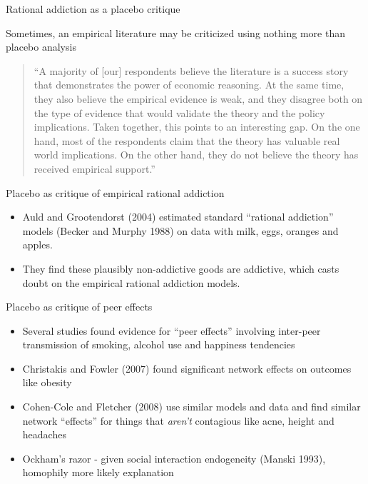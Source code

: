 \documentclass{beamer}
\begin{document}
\begin{frame}{Rational addiction as a placebo critique}


Sometimes, an empirical literature may be criticized using nothing more than placebo analysis

\begin{quote}``A majority of [our] respondents believe the literature is a success story that demonstrates the power of economic reasoning.  At the same time, they also believe the empirical evidence is weak, and they disagree both on the type of evidence that would validate the theory and the policy implications. Taken together, this points to an interesting gap.  On the one hand, most of the respondents claim that the theory has valuable real world implications.  On the other hand, they do not believe the theory has received empirical support.''
\end{quote}

\end{frame}

\begin{frame}{Placebo as critique of empirical rational addiction}

\begin{itemize}
	\item Auld and Grootendorst (2004) estimated standard ``rational addiction'' models (Becker and Murphy 1988) on data with milk, eggs, oranges and apples.  
	\item They find these plausibly non-addictive goods are addictive, which casts doubt on the empirical rational addiction models.
\end{itemize}

\end{frame}

\begin{frame}{Placebo as critique of peer effects}

\begin{itemize}
	\item Several studies found evidence for ``peer effects'' involving inter-peer transmission of smoking, alcohol use and happiness tendencies
	\item Christakis and Fowler (2007) found significant network effects on outcomes like obesity
	\item Cohen-Cole and Fletcher (2008) use similar models and data and find similar network ``effects'' for things that \emph{aren't} contagious like acne, height and headaches
	\item Ockham's razor - given social interaction endogeneity (Manski 1993), homophily more likely explanation
\end{itemize}

\end{frame}
\end{document}
